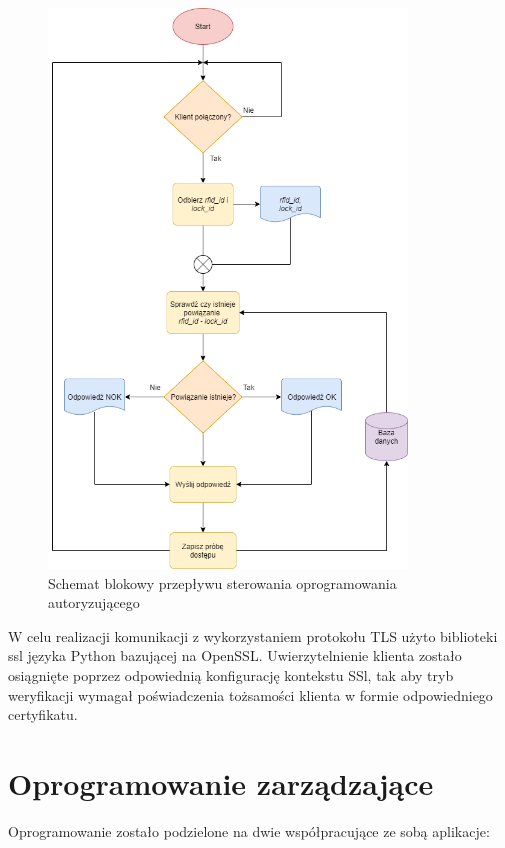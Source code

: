     	\begin{figure}[]
            \centering
            \includegraphics[width=0.85\textwidth]{chapters/images/flowchart5.png}
            \caption{Schemat blokowy przepływu sterowania oprogramowania autoryzującego}
            \label{fig:flowchart5}
        \end{figure}

    	W celu realizacji komunikacji z wykorzystaniem protokołu TLS użyto biblioteki ssl języka Python bazującej na OpenSSL. Uwierzytelnienie klienta zostało osiągnięte poprzez odpowiednią konfigurację kontekstu SSl, tak aby tryb weryfikacji wymagał poświadczenia tożsamości klienta w formie odpowiedniego certyfikatu.

    \section{Oprogramowanie zarządzające}

    	Oprogramowanie zostało podzielone na dwie współpracujące ze sobą aplikacje:

